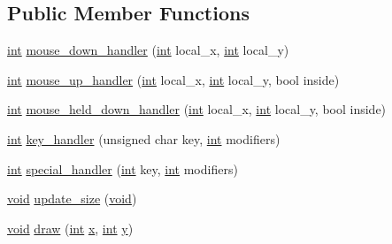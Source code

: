 \subsection*{Public Member Functions}
\begin{DoxyCompactItemize}
\item 
\hyperlink{wglext_8h_a500a82aecba06f4550f6849b8099ca21}{int} \hyperlink{class_g_l_u_i___listbox_aaf335e290bd8367d40a9b868faa8be1c}{mouse\+\_\+down\+\_\+handler} (\hyperlink{wglext_8h_a500a82aecba06f4550f6849b8099ca21}{int} local\+\_\+x, \hyperlink{wglext_8h_a500a82aecba06f4550f6849b8099ca21}{int} local\+\_\+y)
\item 
\hyperlink{wglext_8h_a500a82aecba06f4550f6849b8099ca21}{int} \hyperlink{class_g_l_u_i___listbox_a565e196711dad776a2a6f4afa035d25a}{mouse\+\_\+up\+\_\+handler} (\hyperlink{wglext_8h_a500a82aecba06f4550f6849b8099ca21}{int} local\+\_\+x, \hyperlink{wglext_8h_a500a82aecba06f4550f6849b8099ca21}{int} local\+\_\+y, bool inside)
\item 
\hyperlink{wglext_8h_a500a82aecba06f4550f6849b8099ca21}{int} \hyperlink{class_g_l_u_i___listbox_a425b2552f8e430d19157410681abc91c}{mouse\+\_\+held\+\_\+down\+\_\+handler} (\hyperlink{wglext_8h_a500a82aecba06f4550f6849b8099ca21}{int} local\+\_\+x, \hyperlink{wglext_8h_a500a82aecba06f4550f6849b8099ca21}{int} local\+\_\+y, bool inside)
\item 
\hyperlink{wglext_8h_a500a82aecba06f4550f6849b8099ca21}{int} \hyperlink{class_g_l_u_i___listbox_ac3a007ee056e377322d3a8d6ad0478c4}{key\+\_\+handler} (unsigned char key, \hyperlink{wglext_8h_a500a82aecba06f4550f6849b8099ca21}{int} modifiers)
\item 
\hyperlink{wglext_8h_a500a82aecba06f4550f6849b8099ca21}{int} \hyperlink{class_g_l_u_i___listbox_ab1efa64fe3a73dc5d62ebc540acac2d5}{special\+\_\+handler} (\hyperlink{wglext_8h_a500a82aecba06f4550f6849b8099ca21}{int} key, \hyperlink{wglext_8h_a500a82aecba06f4550f6849b8099ca21}{int} modifiers)
\item 
\hyperlink{wglext_8h_a9e6b7f1933461ef318bb000d6bd13b83}{void} \hyperlink{class_g_l_u_i___listbox_a32bf6c1b068e2af4466a19f797693c8d}{update\+\_\+size} (\hyperlink{wglext_8h_a9e6b7f1933461ef318bb000d6bd13b83}{void})
\item 
\hyperlink{wglext_8h_a9e6b7f1933461ef318bb000d6bd13b83}{void} \hyperlink{class_g_l_u_i___listbox_a279c78e74bcba99d067633a9dc39b878}{draw} (\hyperlink{wglext_8h_a500a82aecba06f4550f6849b8099ca21}{int} \hyperlink{glext_8h_ad77deca22f617d3f0e0eb786445689fc}{x}, \hyperlink{wglext_8h_a500a82aecba06f4550f6849b8099ca21}{int} \hyperlink{glext_8h_a9298c7ad619074f5285b32c6b72bfdea}{y})

\end{DoxyCompactItemize}
